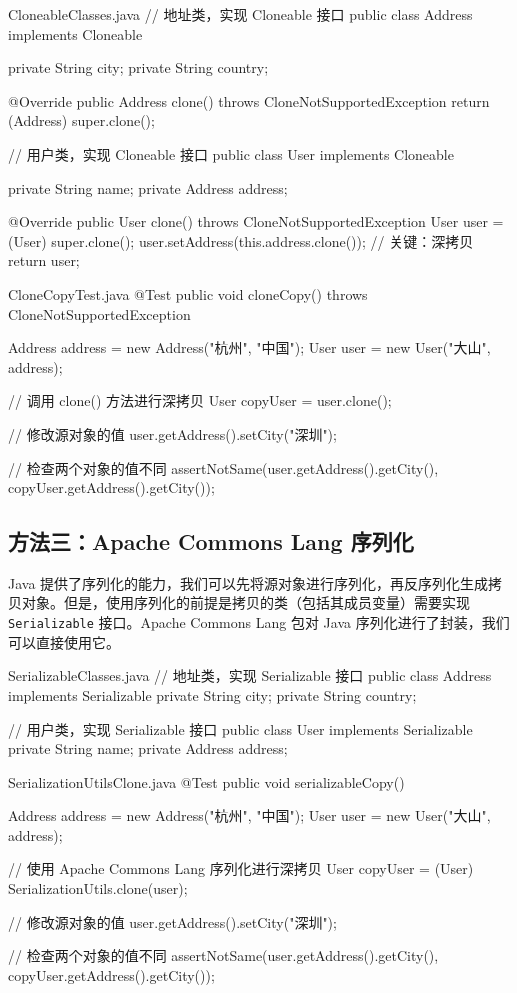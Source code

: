 \begin{codeblock}[Java]{CloneableClasses.java}
// 地址类，实现 Cloneable 接口
public class Address implements Cloneable {
    private String city;
    private String country;

    @Override
    public Address clone() throws CloneNotSupportedException {
        return (Address) super.clone();
    }
}

// 用户类，实现 Cloneable 接口
public class User implements Cloneable {
    private String name;
    private Address address;

    @Override
    public User clone() throws CloneNotSupportedException {
        User user = (User) super.clone();
        user.setAddress(this.address.clone()); // 关键：深拷贝
        return user;
    }
}
\end{codeblock}

\begin{codeblock}[Java]{CloneCopyTest.java}
@Test
public void cloneCopy() throws CloneNotSupportedException {
    Address address = new Address("杭州", "中国");
    User user = new User("大山", address);

    // 调用 clone() 方法进行深拷贝
    User copyUser = user.clone();

    // 修改源对象的值
    user.getAddress().setCity("深圳");

    // 检查两个对象的值不同
    assertNotSame(user.getAddress().getCity(),
        copyUser.getAddress().getCity());
}
\end{codeblock}

\subsection{方法三：Apache Commons Lang 序列化}
Java 提供了序列化的能力，我们可以先将源对象进行序列化，再反序列化生成拷贝对象。但是，使用序列化的前提是拷贝的类（包括其成员变量）需要实现 \texttt{Serializable} 接口。Apache Commons Lang 包对 Java 序列化进行了封装，我们可以直接使用它。

\begin{codeblock}[Java]{SerializableClasses.java}
// 地址类，实现 Serializable 接口
public class Address implements Serializable {
    private String city;
    private String country;
}

// 用户类，实现 Serializable 接口
public class User implements Serializable {
    private String name;
    private Address address;
}
\end{codeblock}

\begin{codeblock}[Java]{SerializationUtilsClone.java}
@Test
public void serializableCopy() {
    Address address = new Address("杭州", "中国");
    User user = new User("大山", address);

    // 使用 Apache Commons Lang 序列化进行深拷贝
    User copyUser = (User) SerializationUtils.clone(user);

    // 修改源对象的值
    user.getAddress().setCity("深圳");

    // 检查两个对象的值不同
    assertNotSame(user.getAddress().getCity(),
        copyUser.getAddress().getCity());
}
\end{codeblock}

